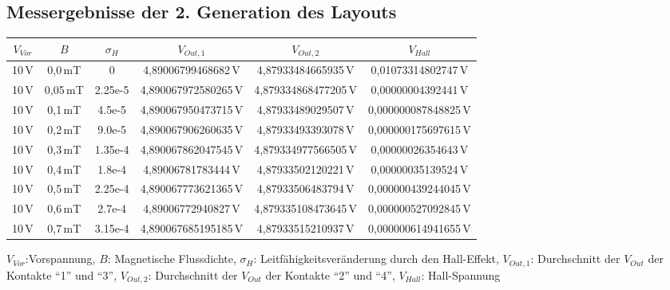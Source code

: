 \documentclass[12pt, a4paper]{article}
\renewcommand{\footnotesize}{\fontsize{10pt}{12pt}\selectfont}
\begin{document}
	\subsection*{Messergebnisse der 2. Generation des Layouts}
		\begin{center}
			\begin{tabular}{||c c c c c c||} 
				\hline
				$V_{Vor}$ & $B$ & $\sigma_H$ & $V_{Out,1}$ & $V_{Out,2}$ & $V_{Hall}$\\ [0.5ex] 
				\hline\hline
				10\,V & 0,0\,mT & 0       & 4,89006799468682\,V  & 4,87933484665935\,V   &  0,01073314802747\,V  \\ 
				\hline
				10\,V & 0,05\,mT& 2.25e-5 & 4,890067972580265\,V & 4,879334868477205\,V  &  0,00000004392441\,V  \\
				\hline
				10\,V & 0,1\,mT & 4.5e-5  & 4,890067950473715\,V & 4,87933489029507\,V   &  0,000000087848825\,V \\
				\hline
				10\,V & 0,2\,mT & 9.0e-5  & 4,890067906260635\,V & 4,87933493393078\,V   &  0,000000175697615\,V \\
				\hline
				10\,V & 0,3\,mT & 1.35e-4 & 4,890067862047545\,V & 4,879334977566505\,V  &  0,00000026354643\,V  \\  
				\hline
				10\,V & 0,4\,mT & 1.8e-4  & 4,89006781783444\,V  & 4,87933502120221\,V   &  0,00000035139524\,V  \\
				\hline
				10\,V & 0,5\,mT & 2.25e-4 & 4,890067773621365\,V & 4,87933506483794\,V   &  0,000000439244045\,V \\
				\hline
				10\,V & 0,6\,mT & 2.7e-4  & 4,89006772940827\,V  & 4,879335108473645\,V  &  0,000000527092845\,V \\
				\hline
				10\,V & 0,7\,mT & 3.15e-4 & 4,890067685195185\,V & 4,87933515210937\,V   &  0,000000614941655\,V \\ [1ex] 
				\hline
			\end{tabular}
		\end{center}
		\vspace{-0.8em}
		\begin{center}
			\footnotesize
			$V_{Vor}$:Vorspannung, $B$: Magnetische Flussdichte, $\sigma_H$: Leitfähigkeitsveränderung durch den Hall-Effekt, $V_{Out,1}$: Durchschnitt der $V_{Out}$ der Kontakte ``1'' und ``3'', $V_{Out,2}$: Durchschnitt der $V_{Out}$ der Kontakte ``2'' und ``4'', $V_{Hall}$: Hall-Spannung
		\end{center}\pagebreak
\end{document}
